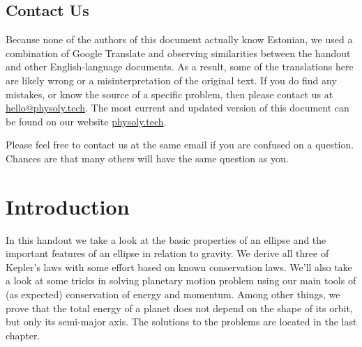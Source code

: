 \documentclass[11pt]{article}
\begin{document}
\subsection*{Contact Us}
\vspace{-5mm}
Because none of the authors of this document actually know Estonian, we used a combination of Google Translate and observing similarities between the handout and other English-language documents. As a result, some of the translations here are likely wrong or a misinterpretation of the original text. If you do find any mistakes, or know the source of a specific problem, then please contact us at \href{mailto:hello@physoly.tech}{hello@physoly.tech}. The most current and updated version of this document can be found on our website \href{https://physoly.tech/}{physoly.tech}.

Please feel free to contact us at the same email if you are confused on a question. Chances are that many others will have the same question as you.

\newpage
\vspace{-5mm}
\section{Introduction}
\vspace{-5mm}
In this handout we take a look at the basic properties of an ellipse and the important features of an ellipse in relation to gravity. We derive all three of Kepler's laws with some effort based on known conservation laws. We'll also take a look at some tricks in solving planetary motion problem using our main tools of (as expected) conservation of energy and momentum. Among other things, we prove that the total energy of a planet does not depend on the shape of its orbit, but only its semi-major axis. The solutions to the problems are located in the last chapter.
\vspace{-5mm}
\end{document}
